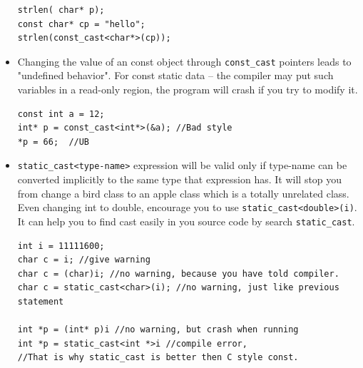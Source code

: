\documentclass[a4paper,11pt,twoside]{book}
\begin{document}
\begin{itemize}
\begin{lstlisting}[numbers = none]
strlen( char* p);
const char* cp = "hello";
strlen(const_cast<char*>(cp));	
\end{lstlisting}

	\item Changing the value of an const object through \texttt{const\_cast} pointers leads to  "undefined behavior". For const static data -- the compiler may put such variables in a read-only region, the program will crash if you try to modify it.

\begin{lstlisting}[numbers = none]
const int a = 12;
int* p = const_cast<int*>(&a); //Bad style
*p = 66;  //UB
\end{lstlisting}

	\item \texttt{static\_cast<type-name>} expression will be valid only if type-name can be converted implicitly to the same type that expression has.  It will stop you from change a bird class to an apple class which is a totally unrelated class.  Even changing int to double, encourage you to use \texttt{static\_cast<double>(i)}.  It can help you to find cast easily in you source code by search \texttt{static\_cast}.
\begin{lstlisting}[numbers = none]
int i = 11111600;
char c = i; //give warning
char c = (char)i; //no warning, because you have told compiler.
char c = static_cast<char>(i); //no warning, just like previous statement

int *p = (int* p)i //no warning, but crash when running
int *p = static_cast<int *>i //compile error, 
//That is why static_cast is better then C style const.
\end{lstlisting}

%
	

\end{itemize}
\end{document}
